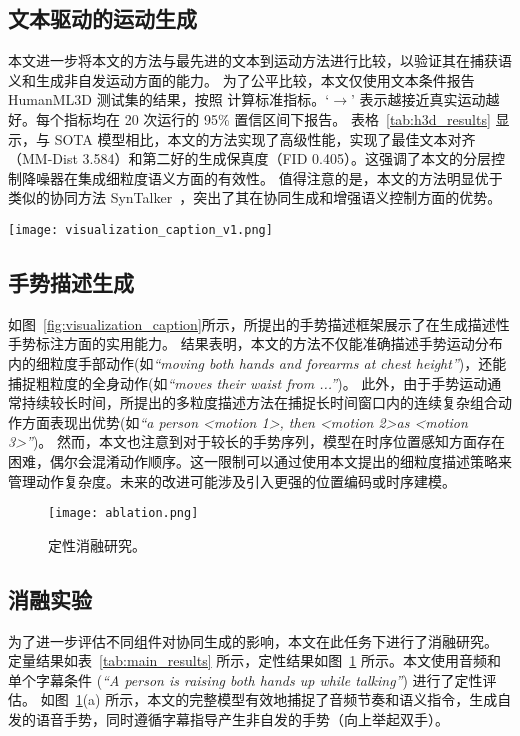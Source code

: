 \subsection{文本驱动的运动生成}
\label{sec:exp_t2m}
本文进一步将本文的方法与最先进的文本到运动方法进行比较，以验证其在捕获语义和生成非自发运动方面的能力。
为了公平比较，本文仅使用文本条件报告 HumanML3D 测试集的结果，按照 \cite{chen2023executing} 计算标准指标。`$\rightarrow$' 表示越接近真实运动越好。每个指标均在 20 次运行的 95\% 置信区间下报告。
表格~\ref{tab:h3d_results} 显示，与 SOTA 模型相比，本文的方法实现了高级性能，实现了最佳文本对齐（MM-Dist 3.584）和第二好的生成保真度（FID 0.405）。这强调了本文的分层控制降噪器在集成细粒度语义方面的有效性。
值得注意的是，本文的方法明显优于类似的协同方法 SynTalker~\cite{chen2024syntalker}，突出了其在协同生成和增强语义控制方面的优势。


\begin{figure*}[t]
  \centering
  \texttt{[image: visualization\_caption\_v1.png]}
  \caption{手势描述生成结果示例。}%
  \label{fig:visualization_caption}
\end{figure*}
\subsection{手势描述生成}
如图~\ref{fig:visualization_caption}所示，所提出的手势描述框架展示了在生成描述性手势标注方面的实用能力。
结果表明，本文的方法不仅能准确描述手势运动分布内的细粒度手部动作(如\textit{``moving both hands and forearms at chest height''})，还能捕捉粗粒度的全身动作(如\textit{``moves their waist from ...''})。
此外，由于手势运动通常持续较长时间，所提出的多粒度描述方法在捕捉长时间窗口内的连续复杂组合动作方面表现出优势(如\textit{``a person \textless motion 1\textgreater, then \textless motion 2\textgreater as \textless motion 3\textgreater''})。
然而，本文也注意到对于较长的手势序列，模型在时序位置感知方面存在困难，偶尔会混淆动作顺序。这一限制可以通过使用本文提出的细粒度描述策略来管理动作复杂度。未来的改进可能涉及引入更强的位置编码或时序建模。

\begin{figure}[t]
    \centering
    \texttt{[image: ablation.png]}
    \caption{定性消融研究。}%
    \label{fig:ablation}
\end{figure}

\subsection{消融实验}
\label{sec:exp_ablation}
为了进一步评估不同组件对协同生成的影响，本文在此任务下进行了消融研究。
定量结果如表~\ref{tab:main_results} 所示，定性结果如图~\ref{fig:ablation} 所示。本文使用音频和单个字幕条件 (\textit{``A person is raising both hands up while talking''}) 进行了定性评估。
如图~\ref{fig:ablation}(a) 所示，本文的完整模型有效地捕捉了音频节奏和语义指令，生成自发的语音手势，同时遵循字幕指导产生非自发的手势（向上举起双手）。

